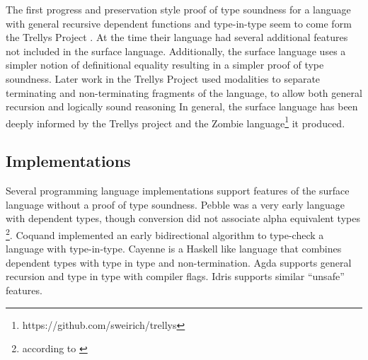 The first progress and preservation style proof of type soundness for a language with general recursive dependent functions and type-in-type seem to come form the Trellys Project \cite{sjoberg2012irrelevance}.
At the time their language had several additional features not included in the surface language.
Additionally, the surface language uses a simpler notion of definitional equality resulting in a simpler proof of type soundness.
Later work in the Trellys Project\cite{casinghino2014combining,casinghino2014combiningthesis} used modalities to separate terminating and non-terminating fragments of the language, to allow both general recursion and logically sound reasoning%
In general, the surface language has been deeply informed by the Trellys project\cite{sjoberg2012irrelevance}\cite{casinghino2014combining,casinghino2014combiningthesis} \cite{sjoberg2015programming} \cite{sjoberg2015dependently} and the Zombie language\footnote{https://github.com/sweirich/trellys} it produced.



\subsection{Implementations}

Several programming language implementations support features of the surface language without a proof of type soundness.
Pebble\cite{10.1007/3-540-13346-1_1} was a very early language with dependent types, though conversion did not associate alpha equivalent types \footnote{according to \cite{Reinhold89typecheckingis}}.
Coquand implemented an early bidirectional algorithm to type-check a language with type-in-type\cite{COQUAND1996167}.
Cayenne \cite{10.1145/289423.289451} is a Haskell like language that combines dependent types with type in type and non-termination.
Agda supports general recursion and type in type with compiler flags.
Idris supports similar ``unsafe'' features.

